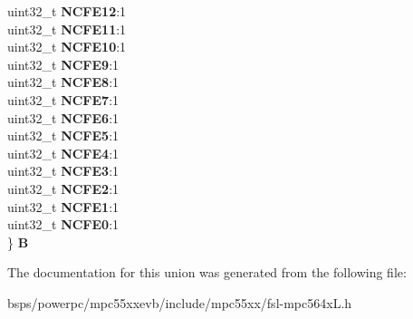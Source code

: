 \begin{DoxyCompactItemize}
\begin{tabbing}
\>uint32\_t {\bfseries NCFE12}:1\\
\>uint32\_t {\bfseries NCFE11}:1\\
\>uint32\_t {\bfseries NCFE10}:1\\
\>uint32\_t {\bfseries NCFE9}:1\\
\>uint32\_t {\bfseries NCFE8}:1\\
\>uint32\_t {\bfseries NCFE7}:1\\
\>uint32\_t {\bfseries NCFE6}:1\\
\>uint32\_t {\bfseries NCFE5}:1\\
\>uint32\_t {\bfseries NCFE4}:1\\
\>uint32\_t {\bfseries NCFE3}:1\\
\>uint32\_t {\bfseries NCFE2}:1\\
\>uint32\_t {\bfseries NCFE1}:1\\
\>uint32\_t {\bfseries NCFE0}:1\\
\} {\bfseries B}\\

\end{tabbing}\end{DoxyCompactItemize}


The documentation for this union was generated from the following file\+:\begin{DoxyCompactItemize}
\item 
bsps/powerpc/mpc55xxevb/include/mpc55xx/fsl-\/mpc564x\+L.\+h\end{DoxyCompactItemize}
